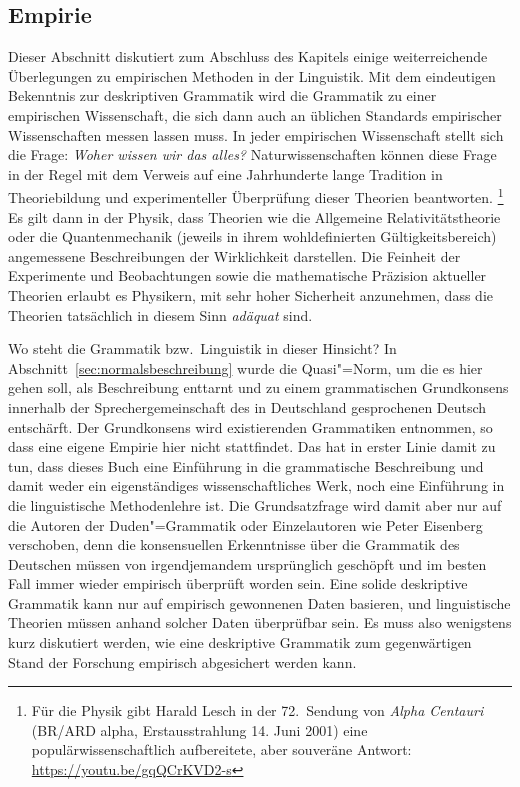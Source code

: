 \subsection{Empirie}

\label{sec:empirie}


Dieser Abschnitt diskutiert zum Abschluss des Kapitels einige weiterreichende Überlegungen zu empirischen Methoden in der Linguistik.
Mit dem eindeutigen Bekenntnis zur deskriptiven Grammatik wird die Grammatik zu einer empirischen Wissenschaft, die sich dann auch an üblichen Standards empirischer Wissenschaften messen lassen muss.
In jeder empirischen Wissenschaft stellt sich die Frage:
\textit{Woher wissen wir das alles?}
Naturwissenschaften können diese Frage in der Regel mit dem Verweis auf eine Jahrhunderte lange Tradition in Theoriebildung und experimenteller Überprüfung dieser Theorien beantworten.%
\footnote{Für die Physik gibt Harald Lesch in der 72.\ Sendung von \textit{Alpha Centauri} (BR\slash ARD alpha, Erstausstrahlung 14. Juni 2001) eine populärwissenschaftlich aufbereitete, aber souveräne Antwort: \url{https://youtu.be/gqQCrKVD2-s}}
Es gilt dann \zB in der Physik, dass Theorien wie die Allgemeine Relativitätstheorie oder die Quantenmechanik (jeweils in ihrem wohldefinierten Gültigkeitsbereich) angemessene Beschreibungen der Wirklichkeit darstellen.
Die Feinheit der Experimente und Beobachtungen sowie die mathematische Präzision aktueller Theorien erlaubt es Physikern, mit sehr hoher Sicherheit anzunehmen, dass die Theorien tatsächlich in diesem Sinn \textit{adäquat} sind.

Wo steht die Grammatik bzw.\ Linguistik in dieser Hinsicht?
In Abschnitt~\ref{sec:normalsbeschreibung} wurde die Quasi"=Norm, um die es hier gehen soll, als Beschreibung enttarnt und zu einem grammatischen Grundkonsens innerhalb der Sprechergemeinschaft des in Deutschland gesprochenen Deutsch entschärft.
Der Grundkonsens wird existierenden Grammatiken entnommen, so dass eine eigene Empirie hier nicht stattfindet.
Das hat in erster Linie damit zu tun, dass dieses Buch eine Einführung in die grammatische Beschreibung und damit weder ein eigenständiges wissenschaftliches Werk, noch eine Einführung in die linguistische Methodenlehre ist.
Die Grundsatzfrage wird damit aber nur auf die Autoren der Duden"=Grammatik oder Einzelautoren wie Peter Eisenberg verschoben, denn die konsensuellen Erkenntnisse über die Grammatik des Deutschen müssen von irgendjemandem ursprünglich geschöpft und im besten Fall immer wieder empirisch überprüft worden sein.
Eine solide deskriptive Grammatik kann nur auf empirisch gewonnenen Daten basieren, und linguistische Theorien müssen anhand solcher Daten überprüfbar sein.
Es muss also wenigstens kurz diskutiert werden, wie eine deskriptive Grammatik zum gegenwärtigen Stand der Forschung empirisch abgesichert werden kann.

